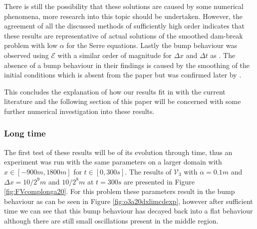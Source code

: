 \documentclass[SingleSpace,12pt,Proceedings]{Serre_ASCE}
\newcommand\solidrule[1][0.25cm]{\rule[0.5ex]{#1}{1pt}}
\begin{document}

There is still the possibility that these solutions are caused by some numerical phenomena, more research into this topic should be undertaken. However, the agreement of all the discussed methods of sufficiently high order indicates that these results are representative of actual solutions of the smoothed dam-break problem with low $\alpha$ for the Serre equations. Lastly the bump behaviour was observed using $\mathcal{E}$ with a similar order of magnitude for $\Delta x$ and $\Delta t$ as . The absence of a bump behaviour in their findings is caused by the smoothing of the initial conditions which is absent from the paper but was confirmed later by .

This concludes the explanation of how our results fit in with the current literature and the following section of this paper will be concerned with some further numerical investigation into these results. 


\subsubsection{Long time}\label{subsubsec:LT}
The first test of these results will be of its evolution through time, thus an experiment was run with the same parameters on a larger domain with $x \in [-900m, 1800m]$ for $t \in [0,300s]$. The results of $\mathcal{V}_3$ with $\alpha = 0.1m$ and $\Delta x = 10/2^{9}m$ and $10/2^{8}m$  at $t = 300s$ are presented in Figure \ref{fig:FVcomplonga20}. For this problem these parameters result in the bump behaviour as can be seen in Figure \ref{fig:o3a20dxlimcdexp}, however after sufficient time we can see that this bump behaviour has decayed back into a flat behaviour although there are still small oscillations present in the middle region. 
\end{document}
